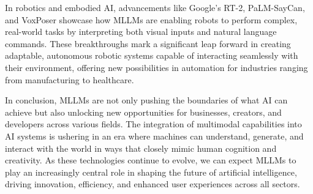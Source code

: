 In robotics and embodied AI, advancements like Google’s RT-2, PaLM-SayCan, and VoxPoser showcase how MLLMs are enabling robots to perform complex, real-world tasks by interpreting both visual inputs and natural language commands. These breakthroughs mark a significant leap forward in creating adaptable, autonomous robotic systems capable of interacting seamlessly with their environment, offering new possibilities in automation for industries ranging from manufacturing to healthcare.

In conclusion, MLLMs are not only pushing the boundaries of what AI can achieve but also unlocking new opportunities for businesses, creators, and developers across various fields. The integration of multimodal capabilities into AI systems is ushering in an era where machines can understand, generate, and interact with the world in ways that closely mimic human cognition and creativity. As these technologies continue to evolve, we can expect MLLMs to play an increasingly central role in shaping the future of artificial intelligence, driving innovation, efficiency, and enhanced user experiences across all sectors.